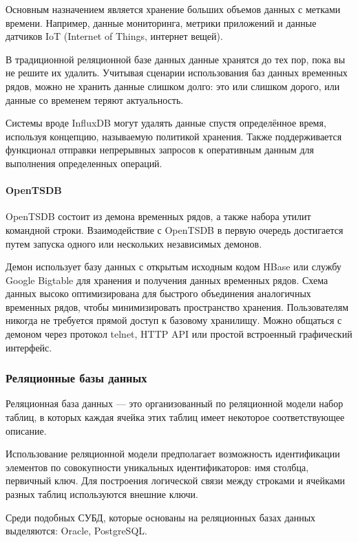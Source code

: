 Основным назначением является хранение больших объемов данных с метками времени. Например, данные мониторинга, метрики приложений и данные датчиков IoT (Internet of Things, интернет вещей).

В традиционной реляционной базе данных данные хранятся до тех пор, пока вы не решите их удалить. Учитывая сценарии использования баз данных временных рядов, можно не хранить данные слишком долго: это или слишком дорого, или данные со временем теряют актуальность. \cite{ryadi}

Системы вроде InfluxDB могут удалять данные спустя определённое время, используя концепцию, называемую политикой хранения. Также поддерживается функционал отправки непрерывных запросов к оперативным данным для выполнения определенных операций. \cite{ryadi}

\paragraph{OpenTSDB}
OpenTSDB состоит из демона временных рядов, а также набора утилит командной строки. Взаимодействие с OpenTSDB в первую очередь достигается путем запуска одного или нескольких независимых демонов.

Демон использует базу данных с открытым исходным кодом HBase или службу Google Bigtable для хранения и получения данных временных рядов. Схема данных высоко оптимизирована для быстрого объединения аналогичных временных рядов, чтобы минимизировать пространство хранения. Пользователям никогда не требуется прямой доступ к базовому хранилищу. Можно общаться с демоном через протокол telnet, HTTP API или простой встроенный графический интерфейс.

\subsubsection{Реляционные базы данных}
Реляционная база данных --- это организованный по реляционной модели набор таблиц, в которых каждая ячейка этих таблиц имеет некоторое соответствующее описание. \cite{relationki}

Использование реляционной модели предполагает возможность идентификации элементов по совокупности уникальных идентификаторов: имя столбца, первичный ключ. Для построения логической связи между строками и ячейками разных таблиц используются внешние ключи. \cite{relationki}

Среди подобных СУБД, которые основаны на реляционных базах данных выделяются: Oracle, PostgreSQL.

